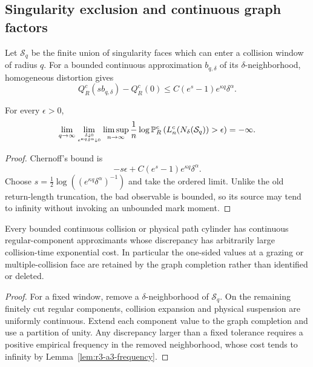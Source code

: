 \subsection{Singularity exclusion and continuous graph factors}

Let \(\mathcal S_q\) be the finite union of singularity faces which can enter
a collision window of radius \(q\).  For a bounded continuous approximation
\(b_{q,\delta}\) of its \(\delta\)-neighborhood, homogeneous distortion gives
\[
 Q_R^c(sb_{q,\delta})-Q_R^c(0)
 \le C(e^s-1)e^{\kappa q}\delta^\alpha.
\]

\begin{lemma}
\label{lem:r3-a3-frequency}
For every \(\epsilon>0\),
\[
 \lim_{q\to\infty}
 \lim_{\delta\downarrow0\atop e^{\kappa q}\delta^\alpha\downarrow0}
 \limsup_{n\to\infty}\frac1n
 \log\mathbb P_R^c\left(
 L_n^c(N_\delta(\mathcal S_q))>\epsilon
 \right)=-\infty.
\]
\end{lemma}

\begin{proof}
Chernoff's bound is
\[
 -s\epsilon+C(e^s-1)e^{\kappa q}\delta^\alpha.
\]
Choose
\(s=\frac12\log((e^{\kappa q}\delta^\alpha)^{-1})\) and take the ordered
limit.  Unlike the old return-length truncation, the bad observable is bounded,
so its source may tend to infinity without invoking an unbounded mark moment.
\end{proof}

\begin{theorem}
\label{thm:r3-a3-factor}
Every bounded continuous collision or physical path cylinder has continuous
regular-component approximants whose discrepancy has arbitrarily large
collision-time exponential cost.  In particular the one-sided values at a
grazing or multiple-collision face are retained by the graph completion rather
than identified or deleted.
\end{theorem}

\begin{proof}
For a fixed window, remove a \(\delta\)-neighborhood of \(\mathcal S_q\).
On the remaining finitely cut regular components, collision expansion and
physical suspension are uniformly continuous.  Extend each component value
to the graph completion and use a partition of unity.  Any discrepancy larger
than a fixed tolerance requires a positive empirical frequency in the removed
neighborhood, whose cost tends to infinity by
Lemma~\ref{lem:r3-a3-frequency}.
\end{proof}

